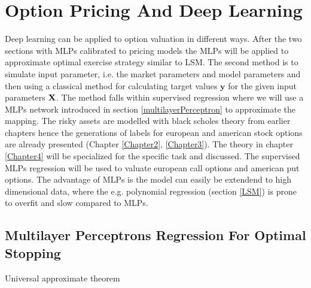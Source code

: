 
\chapter{Option Pricing And Deep Learning} %

\label{Chapter5} %

Deep learning can be applied to option valuation in different ways. After the two sections with MLPs calibrated to pricing models the MLPs will be applied to approximate optimal exercise strategy similar to LSM. The second method is to simulate input parameter, i.e. the market parameters and model parameters and then using a classical method for calculating target values $\bm{y}$ for the given input parameters $\mathbf{X}$. The method falls within supervised regression where we will use a MLPs network introduced in section \ref{multilayerPerceptron} to approximate the mapping. The risky assets are modelled with black scholes theory from earlier chapters hence the generations of labels for european and american stock options are already presented (Chapter \ref{Chapter2}, \ref{Chapter3}). The theory in chapter \ref{Chapter4} will be specialized for the specific task and discussed. The supervised MLPs regression will be used to valuate european call options and american put options. The advantage of MLPs is the model can easily be extendend to high dimensional data, where the e.g. polynomial regression (section \ref{LSM}) is prone to overfit and slow compared to MLPs. 

\section{Multilayer Perceptrons Regression For Optimal Stopping}


Universal approximate theorem


